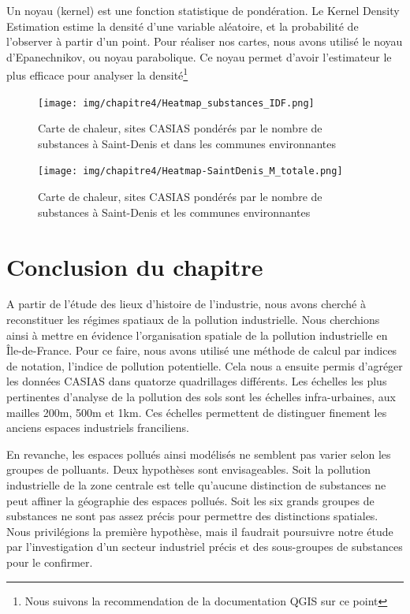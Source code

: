 \documentclass[a4paper,twoside,12pt]{book}
\begin{document}
\begin{tcolorbox}[colback=gray!5!white,colframe=gray!20!white]

Un noyau (kernel) est une fonction statistique de pondération. Le Kernel Density Estimation estime la densité d'une variable aléatoire, et la probabilité de l'observer à partir d'un point. Pour réaliser nos cartes, nous avons utilisé le noyau d'Epanechnikov, ou noyau parabolique.  Ce noyau permet d'avoir l'estimateur le plus efficace pour analyser la densité\footnote{Nous suivons la recommendation de la documentation QGIS sur ce point}
\end{tcolorbox}


\begin{figure}[!h]
\centering 
\texttt{[image: img/chapitre4/Heatmap\_substances\_IDF.png]}
\caption{Carte de chaleur, sites CASIAS pondérés par le nombre de substances à Saint-Denis et dans les communes environnantes}
\label{fig:heatmap_nb_substances}
\end{figure}

\begin{figure}[!h]
\centering 
\texttt{[image: img/chapitre4/Heatmap-SaintDenis\_M\_totale.png]}
\caption{Carte de chaleur, sites CASIAS pondérés par le nombre de substances à Saint-Denis et les communes environnantes}
\label{fig:heatmap_m_totale}
\end{figure}

\section{Conclusion du chapitre}

A partir de l’étude des lieux d’histoire de l’industrie, nous avons cherché à reconstituer les régimes spatiaux de la pollution industrielle. Nous cherchions ainsi à mettre en évidence l’organisation spatiale de la pollution industrielle en Île-de-France. Pour ce faire, nous avons utilisé une méthode de calcul par indices de notation, l'indice de pollution potentielle. Cela nous a ensuite permis d'agréger les données CASIAS dans quatorze quadrillages différents. Les échelles les plus pertinentes d'analyse de la pollution des sols sont les échelles infra-urbaines, aux mailles 200m, 500m et 1km. Ces échelles permettent de distinguer finement les anciens espaces industriels franciliens. 

En revanche, les espaces pollués ainsi modélisés ne semblent pas varier selon les groupes de polluants. Deux hypothèses sont envisageables. Soit la pollution industrielle de la zone centrale est telle qu'aucune distinction de substances ne peut affiner la géographie des espaces pollués. Soit les six grands groupes de substances ne sont pas assez précis pour permettre des distinctions spatiales. Nous privilégions la première hypothèse, mais il faudrait poursuivre notre étude par l'investigation d'un secteur industriel précis et des sous-groupes de substances pour le confirmer.
\end{document}
